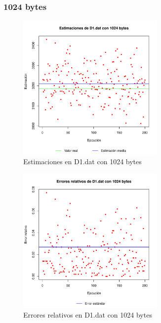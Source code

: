 \subsubsection{1024 bytes}
\begin{figure}[h!]
    \centering
        \includegraphics[width=0.64\textwidth]{../figs/D1/plot_estimation_1024.pdf}
        \caption{Estimaciones en D1.dat con 1024 bytes}
    \label{figura:D1_estimation_1024}
\end{figure}

\begin{figure}[h!]
    \centering
        \includegraphics[width=0.64\textwidth]{../figs/D1/plot_errors_1024.pdf}
        \caption{Errores relativos en D1.dat con 1024 bytes}
    \label{figura:D1_errors_1024}
\end{figure}

